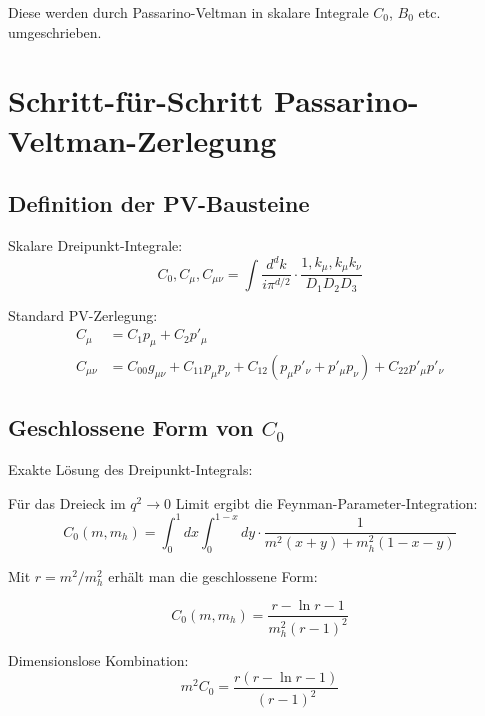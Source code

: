 \documentclass[12pt,a4paper]{article}
\theoremstyle{definition}
\begin{document}
	Diese werden durch Passarino-Veltman in skalare Integrale $C_0$, $B_0$ etc. umgeschrieben.
	
	\section{Schritt-für-Schritt Passarino-Veltman-Zerlegung}
	
	\subsection{Definition der PV-Bausteine}
	
	\begin{pvbox}
		Skalare Dreipunkt-Integrale:
		\begin{equation}
			C_0, C_\mu, C_{\mu\nu} = \int \frac{d^d k}{i\pi^{d/2}} \cdot \frac{1, k_\mu, k_\mu k_\nu}{D_1 D_2 D_3}
		\end{equation}
		
		Standard PV-Zerlegung:
		\begin{align}
			C_\mu &= C_1 p_\mu + C_2 p'_\mu\\
			C_{\mu\nu} &= C_{00} g_{\mu\nu} + C_{11} p_\mu p_\nu + C_{12}(p_\mu p'_\nu + p'_\mu p_\nu) + C_{22} p'_\mu p'_\nu
		\end{align}
	\end{pvbox}
	
	\subsection{Geschlossene Form von $C_0$}
	
	\begin{pvbox}
		Exakte Lösung des Dreipunkt-Integrals:
		
		Für das Dreieck im $q^2 \to 0$ Limit ergibt die Feynman-Parameter-Integration:
		\begin{equation}
			C_0(m, m_h) = \int_0^1 dx \int_0^{1-x} dy \cdot \frac{1}{m^2(x+y) + m_h^2(1-x-y)}
		\end{equation}
		
		Mit $r = m^2/m_h^2$ erhält man die geschlossene Form:
		
		\begin{equation}
			C_0(m, m_h) = \frac{r - \ln r - 1}{m_h^2(r-1)^2}
		\end{equation}
		
		Dimensionslose Kombination:
		\begin{equation}
			m^2C_0 = \frac{r(r - \ln r - 1)}{(r-1)^2}
		\end{equation}
	\end{pvbox}
	
\end{document}
